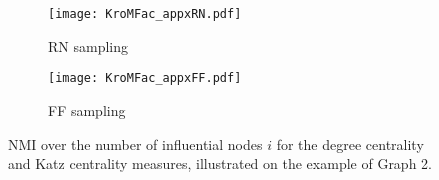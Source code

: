 \documentclass[format=acmsmall, review=false, screen=true]{acmart}
\begin{document}
\begin{figure}[t]
\begin{subfigure}[b]{.48\textwidth}
\centering
\texttt{[image: KroMFac\_appxRN.pdf]}
\caption{RN sampling}\label{fig:comRN}
\end{subfigure}\hspace{1mm}
\begin{subfigure}[b]{.48\textwidth}
\centering
\texttt{[image: KroMFac\_appxFF.pdf]}
\caption{FF sampling}\label{fig:comFF}
\end{subfigure}
    \caption{NMI over the number of influential nodes $i$ for
the degree centrality and Katz centrality measures, illustrated on the
example of Graph 2. }
\label{fig:comcen}
\end{figure}


 
\end{document}

